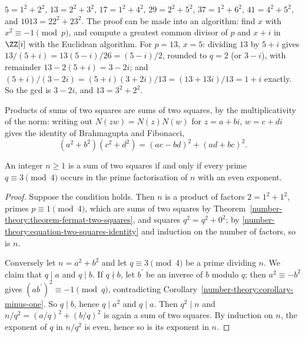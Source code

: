 \begin{example}\label{number-theory:example-fermat}
$5 = 1^2 + 2^2$, $13 = 2^2 + 3^2$, $17 = 1^2 + 4^2$, $29 = 2^2 + 5^2$, $37 = 1^2 + 6^2$, $41 = 4^2 + 5^2$, and $1013 = 22^2 + 23^2$. The proof can be made into an algorithm: find $x$ with
$x^2 \equiv -1 \pmod p$, and compute a greatest common divisor of $p$ and $x + i$ in $\ZZ[i]$ with the Euclidean algorithm. For $p = 13$, $x = 5$: dividing $13$ by $5 + i$ gives
$13/(5 + i) = 13(5 - i)/26 = (5 - i)/2$, rounded to $q = 2$ (or $3 - i$), with remainder $13 - 2(5 + i) = 3 - 2i$; and $(5 + i)/(3 - 2i) = (5 + i)(3 + 2i)/13 = (13 + 13i)/13 = 1 + i$ exactly. So the gcd
is $3 - 2i$, and $13 = 3^2 + 2^2$.
\end{example}

Products of sums of two squares are sums of two squares, by the multiplicativity of the norm: writing out $N(zw) = N(z)N(w)$ for $z = a + bi$, $w = c + di$ gives the identity of Brahmagupta and Fibonacci,
\begin{equation}\label{number-theory:equation-two-squares-identity}
(a^2 + b^2)(c^2 + d^2) = (ac - bd)^2 + (ad + bc)^2 .
\end{equation}

\begin{theorem}\label{number-theory:theorem-two-squares}
An integer $n \geq 1$ is a sum of two squares if and only if every prime $q \equiv 3 \pmod 4$ occurs in the prime factorisation of $n$ with an even exponent.
\end{theorem}

\begin{proof}
Suppose the condition holds. Then $n$ is a product of factors $2 = 1^2 + 1^2$, primes $p \equiv 1 \pmod 4$, which are sums of two squares by Theorem~\ref{number-theory:theorem-fermat-two-squares}, and
squares $q^2 = q^2 + 0^2$; by \eqref{number-theory:equation-two-squares-identity} and induction on the number of factors, so is $n$.

Conversely let $n = a^2 + b^2$ and let $q \equiv 3 \pmod 4$ be a prime dividing $n$. We claim that $q \mid a$ and $q \mid b$. If $q \nmid b$, let $b^{\prime}$ be an inverse of $b$ modulo $q$; then
$a^2 \equiv -b^2$ gives $(ab^{\prime})^2 \equiv -1 \pmod q$, contradicting Corollary~\ref{number-theory:corollary-minus-one}. So $q \mid b$, hence $q \mid a^2$ and $q \mid a$. Then $q^2 \mid n$ and
$n/q^2 = (a/q)^2 + (b/q)^2$ is again a sum of two squares. By induction on $n$, the exponent of $q$ in $n/q^2$ is even, hence so is its exponent in $n$.
\end{proof}

